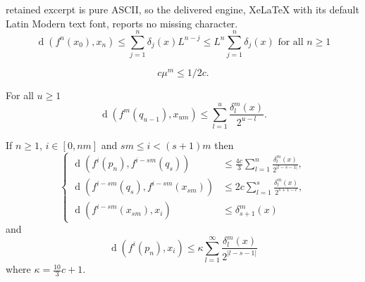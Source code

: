 \documentclass[10pt,a4paper]{amsart}
\DeclareMathOperator{\dist}{d}
\begin{document}
retained excerpt is pure ASCII, so the delivered engine, XeLaTeX with its default Latin Modern text font, reports no missing character.
	\begin{equation}
		\label{ecuShChoto2}
		\dist(f^n(x_0),x_n)
		\leq
		\sum_{j=1}^n\delta_j(x)L^{n-j}
		\leq
		L^n\sum_{j=1}^n\delta_j(x)
		\text{ for all }n\geq 1
	\end{equation}

\begin{equation}
	\label{ecuBowenCondM}
	c\mu^m\leq 1/2c.
\end{equation}

\begin{lem}
	\label{lemBowenWellDef2}
	For all $u\geq 1$
	\begin{equation}
		\label{eculemBowenWellDef2}
		\dist(f^m(q_{u-1}),x_{um})
		\leq
		\sum_{l=1}^u\frac{\delta_l^m(x)}{2^{u-l}}.
	\end{equation}
\end{lem}

\begin{lem}
	\label{lemBowenShdowing2}
	If $n\geq 1$, $i\in[0,nm]$ and
	$sm\leq i<(s+1)m$ then
	\[
	\left\{
	\begin{array}{rl}
		\dist(f^i(p_n),f^{i-sm}(q_s))         &\leq \frac{4c}{3}
			\sum_{l=1}^n\frac{\delta_l^m(x)}{2^{|l-s-1|}},\\
		\dist(f^{i-sm}(q_s),f^{i-sm}(x_{sm})) &\leq 2c \sum_{l=1}^s\frac{\delta_l^m(x)}{2^{s+1-l}},\\
		\dist(f^{i-sm}(x_{sm}),x_i)           &\leq \delta_{s+1}^m(x)
	\end{array}
	\right.
	\]
	and
	\begin{equation}
		\label{ecucotap_n}
	\dist(f^i(p_n),x_i)\leq \kappa \sum_{l=1}^\infty\frac{\delta_l^m(x)}{2^{|l-s-1|}}
	\end{equation}
	where $\kappa=\frac{10}{3}c+1$.
\end{lem}
\end{document}
